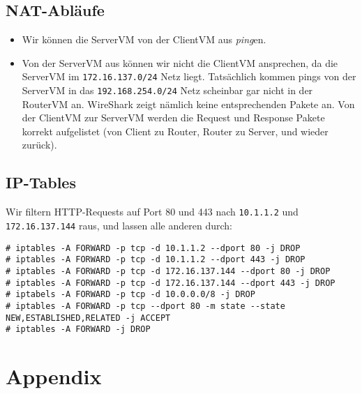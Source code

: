 \documentclass[10pt,a4paper]{article}
\begin{document}
\subsection{NAT-Abläufe} %
\begin{itemize}
    \item Wir können die ServerVM von der ClientVM aus \textit{ping}en.
    \item Von der ServerVM aus können wir nicht die ClientVM ansprechen, da die ServerVM im \texttt{172.16.137.0/24} Netz liegt.
        Tatsächlich kommen pings von der ServerVM in das \texttt{192.168.254.0/24} Netz scheinbar gar nicht in der RouterVM an.
        WireShark zeigt nämlich keine entsprechenden Pakete an. Von der ClientVM zur ServerVM werden die Request und Response
        Pakete korrekt aufgelistet (von Client zu Router, Router zu Server, und wieder zurück).
\end{itemize}

\subsection{IP-Tables} %

Wir filtern HTTP-Requests auf Port 80 und 443 nach \texttt{10.1.1.2} und \texttt{172.16.137.144} raus, und lassen alle anderen durch:
\begin{verbatim}
# iptables -A FORWARD -p tcp -d 10.1.1.2 --dport 80 -j DROP
# iptables -A FORWARD -p tcp -d 10.1.1.2 --dport 443 -j DROP
# iptables -A FORWARD -p tcp -d 172.16.137.144 --dport 80 -j DROP
# iptables -A FORWARD -p tcp -d 172.16.137.144 --dport 443 -j DROP
# iptabels -A FORWARD -p tcp -d 10.0.0.0/8 -j DROP
# iptables -A FORWARD -p tcp --dport 80 -m state --state NEW,ESTABLISHED,RELATED -j ACCEPT
# iptables -A FORWARD -j DROP
\end{verbatim}


\newpage
\section*{Appendix}
\end{document}
